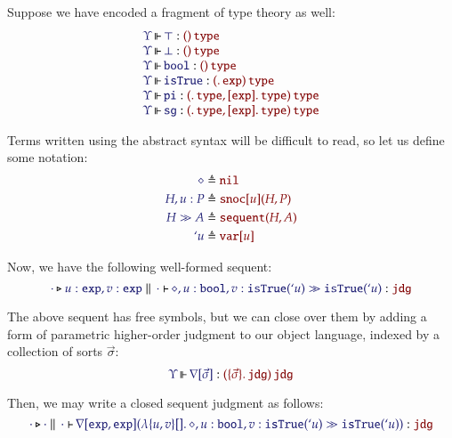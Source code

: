 \documentclass[11pt]{article}
\theoremstyle{definition}
\theoremstyle{remark}
\numberwithin{equation}{section}
\def\IModeColorName{MidnightBlue}
\def\OModeColorName{Maroon}
\newcommand\IMode[1]{{\color{\IModeColorName}{#1}}}
\newcommand\OMode[1]{{\color{\OModeColorName}{#1}}}
\newcommand\MkValence[3]{%
  \ifthenelse{\equal{#1}{}}{}{%
    \{#1\}%
  }%
  \ifthenelse{\equal{#2}{}}{}{%
    [#2]%
  }.\, #3%
}
\newcommand\MkBTm[3]{\mathbb{\lambda}\{#1\}[#2].\, #3}
\newcommand\MkArity[2]{(#1)\, #2}
\newcommand\IsOperator[3]{
  \IMode{#1}\,{\Vdash}\,\IMode{#2}: \OMode{#3}
}
\newcommand\IsAbt[5]{%
  \IMode{#1}\triangleright%
  \IMode{#2}\parallel%
  \,{\IMode{#3}\vdash}\,%
  \IMode{#4}:\OMode{#5}%
}
\newcommand\App[2]{#1(#2)}
\newcommand\SortExp{\mathtt{exp}}
\begin{document}
Suppose we have encoded a fragment of type theory as well:
\[
  \begin{array}{l}
    \IsOperator{\Upsilon}{\top}{
      \MkArity{}{\SortType}
    }
\\
    \IsOperator{\Upsilon}{\bot}{
      \MkArity{}{\SortType}
    }
\\
    \IsOperator{\Upsilon}{\OpBool}{
      \MkArity{}{\SortType}
    }
\\
    \IsOperator{\Upsilon}{\OpSo}{
      \MkArity{
        \MkValence{}{}{\SortExp}
      }{\SortType}
    }
\\
    \IsOperator{\Upsilon}{\OpPi}{
      \MkArity{
        \MkValence{}{}{\SortType},
        \MkValence{}{\SortExp}{\SortType}
      }{\SortType}
    }
\\
    \IsOperator{\Upsilon}{\OpSg}{
      \MkArity{
        \MkValence{}{}{\SortType},
        \MkValence{}{\SortExp}{\SortType}
      }{\SortType}
    }
\\
  \end{array}
\]

Terms written using the abstract syntax will be difficult to read, so let us
define some notation:
\begin{align*}
  \IMode{\diamond}
&
  \triangleq \OMode{\OpNil}
\\
  \IMode{H, u:P}
&
  \triangleq \OMode{
    \App{\OpSnoc{u}}{H, P}
  }
\\
  \IMode{H\gg A}
&
  \triangleq \OMode{
    \App{\OpSequent}{
      H, A
    }
  }
\\
  \IMode{`u}
&
  \triangleq \OMode{\OpVar{u}}
\end{align*}

Now, we have the following well-formed sequent:
\[
  \IsAbt{\cdot}{
    u:\SortExp,
    v:\SortExp
  }{\cdot}{
    \diamond,u:\OpBool,v:\App{\OpSo}{`u}
    \gg
    \App{\OpSo}{`u}
  }{\SortJdg}
\]

\newcommand\OpNabla[1]{\nabla[#1]}

The above sequent has free symbols, but we can close over them by adding a form
of parametric higher-order judgment to our object language, indexed by a
collection of sorts $\vec{\sigma}$:
\[
  \IsOperator{\Upsilon}{\OpNabla{\vec{\sigma}}}{
    \MkArity{
      \MkValence{\vec{\sigma}}{}{\SortJdg}
    }{\SortJdg}
  }
\]

Then, we may write a closed sequent judgment as follows:
\[
  \IsAbt{\cdot}{\cdot}{\cdot}{
    \App{\OpNabla{\SortExp,\SortExp}}{
      \MkBTm{u,v}{}{
        \diamond,u:\OpBool,v:\App{\OpSo}{`u}
        \gg
        \App{\OpSo}{`u}
      }
    }
  }{\SortJdg}
\]
\end{document}
